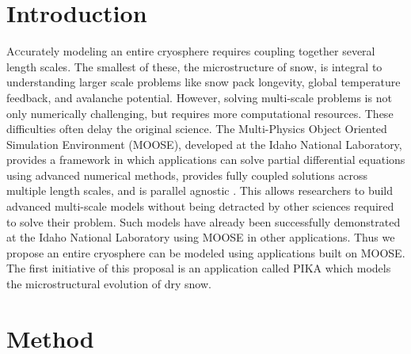 \documentclass[twoside]{article}
\begin{document}
\begin{multicols}{2} %
\section{Introduction}

\lettrine[nindent=0em,lines=2]{A}ccurately modeling an entire cryosphere requires coupling together several length scales. The smallest of these, the microstructure of snow, is integral to understanding larger scale problems like snow pack longevity, global temperature feedback, and avalanche potential. However, solving multi-scale problems is not only numerically challenging, but requires more computational resources. These difficulties often delay the original science. The Multi-Physics Object Oriented Simulation Environment (MOOSE), developed at the Idaho National Laboratory, provides a framework in which applications can solve partial differential equations using advanced numerical methods, provides fully coupled solutions across multiple length scales, and is parallel agnostic \cite{Gaston_2009}. This allows researchers to build advanced multi-scale models without being detracted by other sciences required to solve their problem. Such models have already been successfully demonstrated at the Idaho National Laboratory using MOOSE in other applications. Thus we propose an entire cryosphere can be modeled using applications built on MOOSE. The first initiative of this proposal is an application called PIKA which models the microstructural evolution of dry snow.

\section{Method}


\end{multicols}
\end{document}
